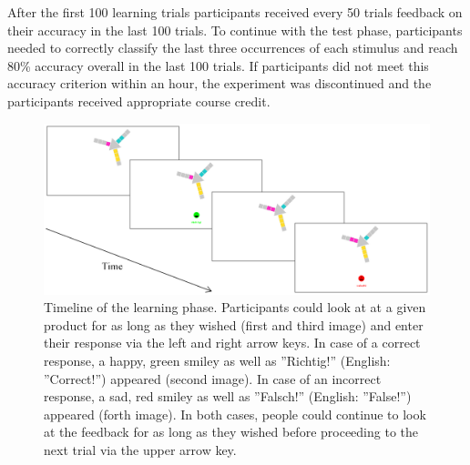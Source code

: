 \documentclass[a4paper,man,natbib]{apa6}
\begin{document}
After the first 100 learning trials participants received every 50 trials feedback on their accuracy in the last 100 trials. To continue with the test phase, participants needed to correctly classify the last three occurrences of each stimulus and reach 80\% accuracy overall in the last 100 trials. If participants did not meet this accuracy criterion within an hour, the experiment was discontinued and the participants received appropriate course credit.

\begin{figure}
\centering
\includegraphics[width = \textwidth]{fig_timeline.png}
\caption{Timeline of the learning phase. Participants could look at at a given product for as long as they wished (first and third image) and enter their response via the left and right arrow keys. In case of a correct response, a happy, green smiley as well as ''Richtig!'' (English: ''Correct!'') appeared (second image). In case of an incorrect response, a sad, red smiley as well as ''Falsch!'' (English: ''False!'') appeared (forth image). In both cases, people could continue to look at the feedback for as long as they wished before proceeding to the next trial via the upper arrow key.}
\label{fig:timeline}
\end{figure}
\end{document}
